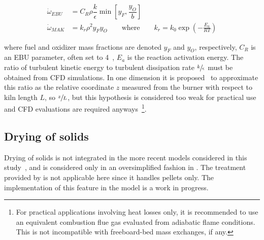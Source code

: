 \documentclass[11pt]{paper}
\newif\ifnotdraft
\begin{document}
\begin{align}
\dot{\omega}_{EBU} &=
C_{R}\rho\dfrac{k}{\epsilon}\min\left[y_{F},\dfrac{y_{O}}{b}\right]\\
\dot{\omega}_{MAK} &=
k_{r}\rho^{2}y_{F}y_{O}\qquad\text{where}\qquad{}k_{r}=k_{0}\exp\left(-\frac{E_{a}}{RT}\right)
\end{align}

\noindent{}where fuel and oxidizer mass fractions are denoted $y_{F}$ and $y_{O}$, respectively, $C_{R}$ is an {EBU} parameter, often set to 4~\cite{Mujumdar2006i}, $E_{a}$ is the reaction activation energy. The ratio of turbulent kinetic energy to turbulent dissipation rate $\sfrac{k}{\epsilon}$ must be obtained from {CFD} simulations. In one dimension it is proposed~\cite{Mujumdar2006i} to approximate this ratio as the relative coordinate $z$ measured from the burner with respect to kiln length $L$, so $\sfrac{z}{L}$, but this hypothesis is considered too weak for practical use and {CFD} evaluations are required anyways~\footnote{For practical applications involving heat losses only, it is recommended to use an equivalent combustion flue gas evaluated from adiabatic flame conditions. This is not incompatible with freeboard-bed mass exchanges, if any.}.

\ifnotdraft
Parameter $b$

\begin{table}
\centering%
\caption{\label{tab:methane-combustion}Parameters for methane combustion rate expression.}
\end{table}
\fi

\subsection{Drying of solids}

Drying of solids is not integrated in the more recent models considered in this study~\cite{Boateng1996,Mujumdar2006i,Mujumdar2006ii,Fan2013,Csernyei2016,Hanein2017,Shcherbina2019}, and is considered only in an oversimplified fashion in \textcite{Manitius1974}. The treatment provided by \textcite{Thurlby1988} is not applicable here since it handles pellets only. The implementation of this feature in the model is a work in progress.
\end{document}
